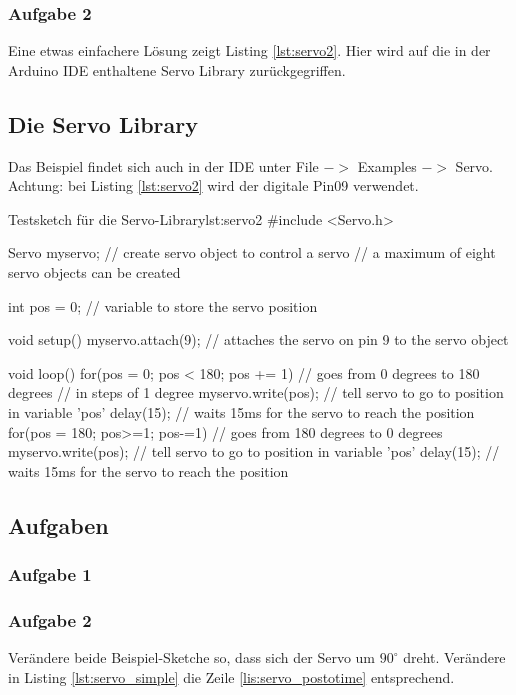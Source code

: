 \subsubsection{Aufgabe 2}

Eine etwas einfachere Lösung zeigt Listing \ref{lst:servo2}. Hier wird auf die in der Arduino IDE
 enthaltene Servo Library zurückgegriffen.
 
\subsection{Die Servo Library} %
 Das Beispiel findet sich auch in der IDE unter 
 File $->$ Examples $-> $ Servo.  Achtung: bei Listing \ref{lst:servo2} wird der digitale Pin09 verwendet.

\begin{arduinoCode}{Testsketch für die Servo-Library}{lst:servo2}
#include <Servo.h> 
 
Servo myservo;  // create servo object to control a servo 
                // a maximum of eight servo objects can be created 
 
int pos = 0;    // variable to store the servo position 
 
void setup() 
{ 
  myservo.attach(9);  // attaches the servo on pin 9 to the servo object 
} 
 
 
void loop() 
{ 
  for(pos = 0; pos < 180; pos += 1)  // goes from 0 degrees to 180 degrees 
  {                                  // in steps of 1 degree 
    myservo.write(pos);              // tell servo to go to position in variable 'pos' 
    delay(15);                       // waits 15ms for the servo to reach the position 
  } 
  for(pos = 180; pos>=1; pos-=1)     // goes from 180 degrees to 0 degrees 
  {                                
    myservo.write(pos);              // tell servo to go to position in variable 'pos' 
    delay(15);                       // waits 15ms for the servo to reach the position 
  } 
} 
\end{arduinoCode}

\subsection{Aufgaben}

\subsubsection{Aufgabe 1}


\subsubsection{Aufgabe 2}
Verändere beide Beispiel-Sketche so, dass sich der Servo um $90^\circ$ dreht. Verändere in Listing
\ref{lst:servo_simple} die Zeile \ref{lis:servo_postotime} entsprechend. 

